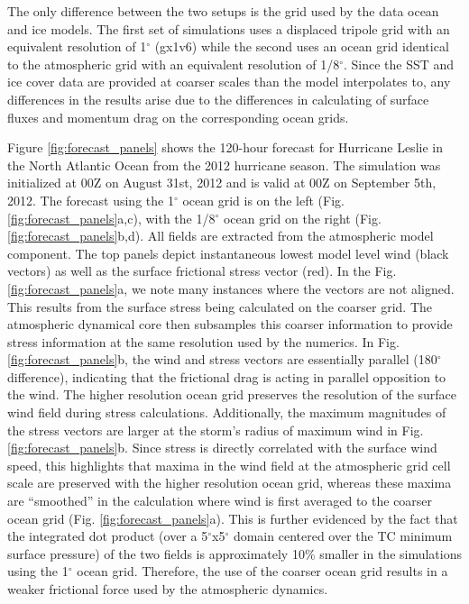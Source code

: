 \documentclass[draft,ms]{AGUTeX}
\newcommand{\degree}{$^{\circ}$}
\begin{document}
\begin{article}
The only difference between the two setups is the grid used by the data ocean and ice models. The first set of simulations uses a displaced tripole grid with an equivalent resolution of 1\degree{} (gx1v6) while the second uses an ocean grid identical to the atmospheric grid with an equivalent resolution of 1/8\degree{}. Since the SST and ice cover data are provided at coarser scales than the model interpolates to, any differences in the results arise due to the differences in calculating of surface fluxes and momentum drag on the corresponding ocean grids.

Figure \ref{fig:forecast_panels} shows the 120-hour forecast for Hurricane Leslie in the North Atlantic Ocean from the 2012 hurricane season. The simulation was initialized at 00Z on August 31st, 2012 and is valid at 00Z on September 5th, 2012. The forecast using the 1\degree{} ocean grid is on the left (Fig. \ref{fig:forecast_panels}a,c), with the 1/8\degree{} ocean grid on the right (Fig. \ref{fig:forecast_panels}b,d). All fields are extracted from the atmospheric model component. The top panels depict instantaneous lowest model level wind (black vectors) as well as the surface frictional stress vector (red). In the Fig. \ref{fig:forecast_panels}a, we note many instances where the vectors are not aligned. This results from the surface stress being calculated on the coarser grid. The atmospheric dynamical core then subsamples this coarser information to provide stress information at the same resolution used by the numerics. In Fig. \ref{fig:forecast_panels}b, the wind and stress vectors are essentially parallel (180\degree{} difference), indicating that the frictional drag is acting in parallel opposition to the wind. The higher resolution ocean grid preserves the resolution of the surface wind field during stress calculations. Additionally, the maximum magnitudes of the stress vectors are larger at the storm's radius of maximum wind in Fig. \ref{fig:forecast_panels}b. Since stress is directly correlated with the surface wind speed, this highlights that maxima in the wind field at the atmospheric grid cell scale are preserved with the higher resolution ocean grid, whereas these maxima are ``smoothed'' in the calculation where wind is first averaged to the coarser ocean grid (Fig. \ref{fig:forecast_panels}a). This is further evidenced by the fact that the integrated dot product (over a 5\degree{}x5\degree{} domain centered over the TC minimum surface pressure) of the two fields is approximately 10\% smaller in the simulations using the 1\degree{} ocean grid. Therefore, the use of the coarser ocean grid results in a weaker frictional force used by the atmospheric dynamics.


\end{article}
\end{document}
